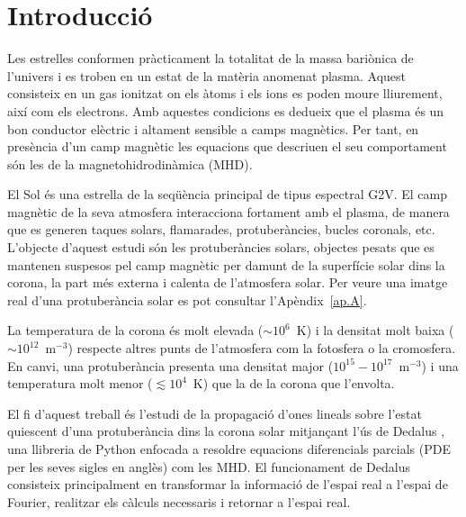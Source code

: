 
\chapter{Introducció} \label{sec:intro}



Les estrelles conformen pràcticament la totalitat de la massa bariònica de l'univers i es troben en un estat de la matèria anomenat plasma.
Aquest consisteix en un gas ionitzat on els àtoms i els ions es poden moure lliurement, així com els electrons.
Amb aquestes condicions es dedueix que el plasma és un bon conductor elèctric i altament sensible a camps magnètics.
Per tant, en presència d'un camp magnètic les equacions que descriuen el seu comportament són les de la magnetohidrodinàmica (MHD).

El Sol és una estrella de la seqüència principal de tipus espectral G2V.
El camp magnètic de la seva atmosfera interacciona fortament amb el plasma, de manera que es generen taques solars, flamarades, protuberàncies, bucles coronals, etc.
L'objecte d'aquest estudi són les protuberàncies solars,
objectes pesats que es mantenen suspesos pel camp magnètic per damunt de la superfície solar dins la corona,
la part més externa i calenta de l'atmosfera solar.
Per veure una imatge real d'una protuberància solar es pot consultar l'Apèndix~\ref{ap.A}.

La temperatura de la corona és molt elevada ($\sim 10^6$~K) i la densitat molt baixa ($\sim 10^{12}$~m$^{-3}$) respecte altres punts de l'atmosfera com la fotosfera o la cromosfera.
En canvi, una protuberància presenta una densitat major ($10^{15}-10^{17}$~m$^{-3}$) i una temperatura molt menor ($\lesssim10^4$~K) que la de la corona que l'envolta.


El fi d'aquest treball és l'estudi de la propagació d'ones lineals sobre l'estat quiescent d'una protuberància dins la corona solar mitjançant l'ús de Dedalus \parencite{Dedalus},
una llibreria de Python enfocada a resoldre equacions diferencials parcials (PDE per les seves sigles en anglès) com les MHD.
El funcionament de Dedalus consisteix principalment en transformar la informació de l'espai real a l'espai de Fourier,
realitzar els càlculs necessaris i retornar a l'espai real.

